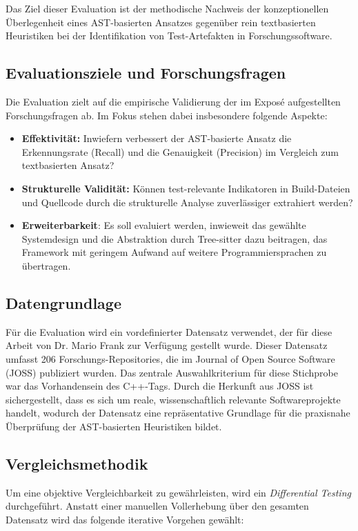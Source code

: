 \documentclass[12pt,titlepage]{article}
\begin{document}
Das Ziel dieser Evaluation ist der methodische Nachweis der konzeptionellen Überlegenheit eines AST-basierten Ansatzes gegenüber rein textbasierten Heuristiken bei der Identifikation von Test-Artefakten in Forschungssoftware. 

\subsection{Evaluationsziele und Forschungsfragen}
Die Evaluation zielt auf die empirische Validierung der im Exposé aufgestellten Forschungsfragen ab. Im Fokus stehen dabei insbesondere folgende Aspekte:
\begin{itemize}
    \item \textbf{Effektivität:} Inwiefern verbessert der AST-basierte Ansatz die Erkennungsrate (Recall) und die Genauigkeit (Precision) im Vergleich zum textbasierten Ansatz?
    \item \textbf{Strukturelle Validität:} Können test-relevante Indikatoren in Build-Dateien und Quellcode durch die strukturelle Analyse zuverlässiger extrahiert werden?
    \item \textbf{Erweiterbarkeit}: Es soll evaluiert werden, inwieweit das gewählte Systemdesign und die Abstraktion durch Tree-sitter dazu beitragen, das Framework mit geringem Aufwand auf weitere Programmiersprachen zu übertragen.
\end{itemize}

\subsection{Datengrundlage}
Für die Evaluation wird ein vordefinierter Datensatz verwendet, der für diese Arbeit von Dr. Mario Frank zur Verfügung gestellt wurde. Dieser Datensatz umfasst 206 Forschungs-Repositories, die im Journal of Open Source Software (JOSS) publiziert wurden. Das zentrale Auswahlkriterium für diese Stichprobe war das Vorhandensein des \glqq C++\grqq-Tags. Durch die Herkunft aus JOSS ist sichergestellt, dass es sich um reale, wissenschaftlich relevante Softwareprojekte handelt, wodurch der Datensatz  eine repräsentative Grundlage für die praxisnahe Überprüfung der AST-basierten Heuristiken bildet.

\subsection{Vergleichsmethodik}
Um eine objektive Vergleichbarkeit zu gewährleisten, wird ein \textit{Differential Testing} durchgeführt. Anstatt einer manuellen Vollerhebung über den gesamten Datensatz wird das folgende iterative Vorgehen gewählt:
\end{document}
